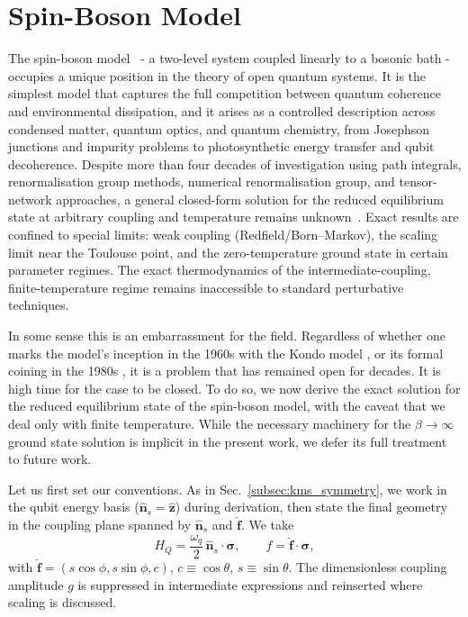 \section{Spin-Boson Model}
\label{subsec:qubit_exact_geometry}

The spin-boson model~\cite{leggettDynamicsDissipativeTwostate1987,weissQuantumDissipativeSystems2012} - a two-level system coupled linearly to a
bosonic bath - occupies a unique position in the theory of open quantum systems. It is the simplest
model that captures the full competition between quantum coherence and environmental dissipation, and
it arises as a controlled description across condensed matter, quantum optics, and quantum chemistry,
from Josephson junctions and impurity problems to photosynthetic energy transfer and qubit
decoherence. Despite more than four decades of investigation using path integrals, renormalisation
group methods, numerical renormalisation group, and tensor-network approaches, a general closed-form
solution for the reduced equilibrium state at arbitrary coupling and temperature remains
unknown~\cite{leggettDynamicsDissipativeTwostate1987,weissQuantumDissipativeSystems2012,Bulla2008,Vojta2006}. Exact results are confined to
special limits: weak coupling (Redfield/Born--Markov), the scaling limit near the
Toulouse point, and the zero-temperature ground state in certain parameter regimes. The exact
thermodynamics of the intermediate-coupling, finite-temperature regime remains inaccessible to
standard perturbative techniques. 

In some sense this is an embarrassment for the field. Regardless of whether one marks the model's inception in the 1960s with the Kondo model \cite{Kondo1964}, or its formal coining in the 1980s \cite{leggettDynamicsDissipativeTwostate1987}, it is a problem that has remained open for decades. It is high time for the case to be closed. To do so, we now derive the exact solution for the reduced equilibrium state of the spin-boson model, with the caveat that we deal only with finite temperature. While the necessary machinery for the $\beta \to \infty$ ground state solution is implicit in the present work, we defer its full treatment to future work.

Let us first set our conventions. As in Sec.~\ref{subsec:kms_symmetry}, we work in the qubit energy basis
(\(\hat{\mathbf n}_s=\hat{\mathbf z}\)) during derivation, then state the final geometry in the
coupling plane spanned by \(\hat{\mathbf n}_s\) and \(\hat{\mathbf f}\). We take
\begin{equation}
    H_Q = \frac{\omega_q}{2}\,\hat{\mathbf n}_s\!\cdot\!\boldsymbol{\sigma}, \qquad
    f = \hat{\mathbf f}\!\cdot\!\boldsymbol{\sigma},
\end{equation}
with \(\hat{\mathbf f}=(s\cos\phi,s\sin\phi,c)\), \(c\equiv\cos\theta\), \(s\equiv\sin\theta\).
The dimensionless coupling amplitude \(g\) is suppressed in intermediate expressions and reinserted
where scaling is discussed.

